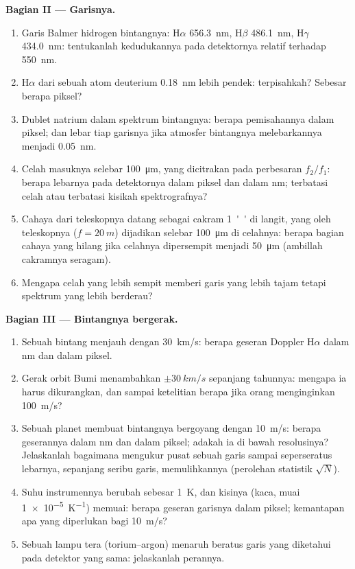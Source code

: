 \begin{problem}
\medskip
\noindent\textbf{Bagian II --- Garisnya.}
\begin{enumerate}[resume]
  \item Garis Balmer hidrogen bintangnya: H$\alpha$ \qty{656.3}{nm},
        H$\beta$ \qty{486.1}{nm}, H$\gamma$ \qty{434.0}{nm}: tentukanlah kedudukannya pada
        detektornya relatif terhadap \qty{550}{nm}.
  \item H$\alpha$ dari sebuah atom deuterium \qty{0.18}{nm} lebih pendek: terpisahkah?
        Sebesar berapa piksel?
  \item Dublet natrium dalam spektrum bintangnya: berapa pemisahannya dalam
        piksel; dan lebar tiap garisnya jika atmosfer bintangnya
        melebarkannya menjadi \qty{0.05}{nm}.
  \item Celah masuknya selebar \qty{100}{\micro m}, yang dicitrakan pada
        perbesaran $f_2/f_1$: berapa lebarnya pada detektornya dalam piksel dan
        dalam nm; terbatasi celah atau terbatasi kisikah spektrografnya?
  \item Cahaya dari teleskopnya datang sebagai cakram \qty{1}{''} di
        langit, yang oleh teleskopnya ($f = \qty{20}{m}$) dijadikan selebar \qty{100}{\micro m}
        di celahnya: berapa bagian cahaya yang hilang jika celahnya
        dipersempit menjadi \qty{50}{\micro m} (ambillah cakramnya seragam).
  \item Mengapa celah yang lebih sempit memberi garis yang lebih tajam tetapi spektrum
        yang lebih berderau?
\end{enumerate}

\medskip
\noindent\textbf{Bagian III --- Bintangnya bergerak.}
\begin{enumerate}[resume]
  \item Sebuah bintang menjauh dengan \qty{30}{km/s}: berapa geseran Doppler H$\alpha$ dalam nm
        dan dalam piksel.
  \item Gerak orbit Bumi menambahkan $\pm\qty{30}{km/s}$ sepanjang tahunnya:
        mengapa ia harus dikurangkan, dan sampai ketelitian berapa jika orang menginginkan
        \qty{100}{m/s}?
  \item Sebuah planet membuat bintangnya bergoyang dengan \qty{10}{m/s}: berapa geserannya dalam nm dan
        dalam piksel; adakah ia di bawah resolusinya? Jelaskanlah bagaimana mengukur
        pusat sebuah garis sampai seperseratus lebarnya, sepanjang
        seribu garis, memulihkannya (perolehan statistik $\sqrt{N}$).
  \item Suhu instrumennya berubah sebesar \qty{1}{K}, dan
        kisinya (kaca, muai \qty{1e-5}{K^{-1}}) memuai: berapa geseran
        garisnya dalam piksel; kemantapan apa yang diperlukan bagi \qty{10}{m/s}?
  \item Sebuah lampu tera (torium--argon) menaruh beratus garis yang diketahui
        pada detektor yang sama: jelaskanlah perannya.
\end{enumerate}


\end{problem}
